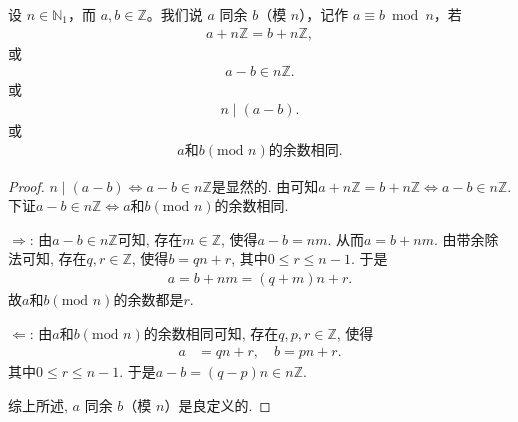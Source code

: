 \documentclass[../../main.tex]{subfiles}
\begin{document}
\begin{definition}[同余(模$n$)]
设 $n\in \mathbb{N}_1$，而 $a,b\in \mathbb{Z}$。我们说 $a$ 同余 $b$（模 $n$），记作 $a\equiv b\bmod n$，若
\begin{align*}
a + n\mathbb{Z}=b + n\mathbb{Z},
\end{align*}
或
\begin{align*}
a - b\in n\mathbb{Z}.
\end{align*}
或
\begin{align*}
n\mid (a-b).
\end{align*}
或
\begin{align*}
    a\text{和}b (\mathrm{mod}\,\,n)\text{的余数相同}.
\end{align*}
\end{definition}
\begin{proof}
$n\mid (a-b)\Leftrightarrow a - b\in n\mathbb{Z}$是显然的.
由可知$a+n\mathbb{Z} =b+n\mathbb{Z} \Leftrightarrow a-b\in n\mathbb{Z} .$下证$a - b \in n\mathbb{Z} \Leftrightarrow a$和$b (\mathrm{mod}\,\,n)$的余数相同.

$\Rightarrow$: 由$a - b \in n\mathbb{Z}$可知, 存在$m \in \mathbb{Z}$, 使得$a - b = nm$. 从而$a = b + nm$. 由带余除法可知, 存在$q, r \in \mathbb{Z}$, 使得$b = qn + r$, 其中$0 \leqslant r \leqslant n - 1$. 于是
\begin{align*}
a = b + nm 
= (q + m)n + r.
\end{align*}
故$a$和$b (\mathrm{mod}\,\,n)$的余数都是$r$.

$\Leftarrow$: 由$a$和$b (\mathrm{mod}\,\,n)$的余数相同可知, 存在$q, p, r \in \mathbb{Z}$, 使得
\begin{align*}
a &= qn + r, \quad b = pn + r.
\end{align*}
其中$0 \leqslant r \leqslant n - 1$. 于是$a - b = (q - p)n \in n\mathbb{Z}$.

综上所述, $a$ 同余 $b$（模 $n$）是良定义的.

\end{proof}
\end{document}
